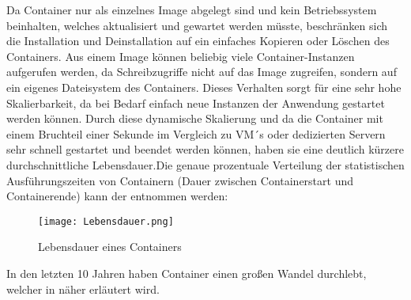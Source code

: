 Da Container nur als einzelnes Image abgelegt sind und kein Betriebssystem beinhalten, welches aktualisiert und gewartet werden müsste, beschränken sich die Installation und Deinstallation auf ein einfaches Kopieren oder Löschen des Containers. 
Aus einem Image können beliebig viele Container-Instanzen aufgerufen werden, da Schreibzugriffe nicht auf das Image zugreifen, sondern auf ein eigenes Dateisystem des Containers. Dieses Verhalten sorgt für eine sehr hohe Skalierbarkeit, da bei Bedarf einfach neue Instanzen der Anwendung gestartet werden können.\cite{12771285120180201}
Durch diese dynamische Skalierung und da die Container mit einem Bruchteil einer Sekunde im Vergleich zu VM´s oder dedizierten Servern sehr schnell gestartet und beendet werden können, haben sie eine deutlich kürzere durchschnittliche Lebensdauer.\newpage Die genaue prozentuale Verteilung der statistischen Ausführungszeiten von Containern (Dauer zwischen Containerstart und Containerende) kann der  entnommen werden:
\begin{figure}[H]
	\begin{center}
		\texttt{[image: Lebensdauer.png]}
	\end{center}
	\caption[Lebensdauer eines Containers]{Lebensdauer eines Containers \footnotemark}
	\label{fig:Lebensdauer}
\end{figure}
In den letzten 10 Jahren haben Container einen großen Wandel durchlebt, welcher in  näher erläutert wird.
\newpage
